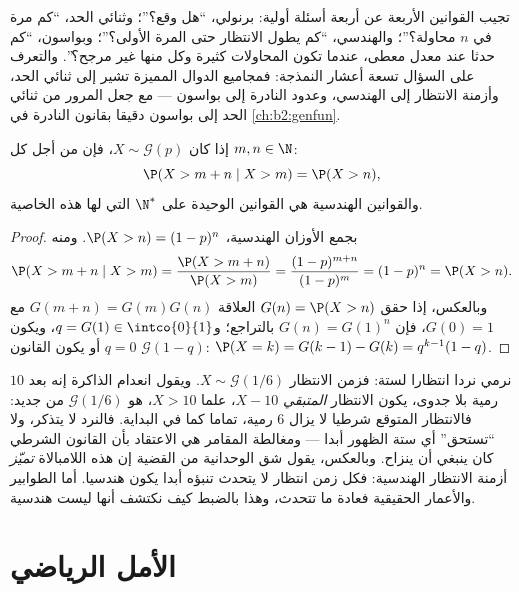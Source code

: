 \begin{remark}
تجيب القوانين الأربعة عن أربعة أسئلة أولية: برنولي، ``هل وقع؟''؛
وثنائي الحد، ``كم مرة في $n$ محاولة؟''؛ والهندسي، ``كم يطول
الانتظار حتى المرة الأولى؟''؛ وبواسون، ``كم حدثا عند معدل معطى،
عندما تكون المحاولات كثيرة وكل منها غير مرجح؟''. والتعرف على السؤال
تسعة أعشار النمذجة: فمجاميع الدوال المميزة تشير إلى ثنائي الحد،
وأزمنة الانتظار إلى الهندسي، وعدود  النادرة إلى بواسون ---
مع جعل المرور من ثنائي الحد إلى بواسون دقيقا بقانون  النادرة
في \cref{ch:b2:genfun}.
\end{remark}

\begin{proposition}\label{prop:b2:randomvar:memoryless}
إذا كان $X \sim \mathcal{G}(p)$، فإن من أجل كل $m, n \in \N$:
\[
\P(X > m + n \mid X > m) = \P(X > n) ,
\]
والقوانين الهندسية هي القوانين الوحيدة على $\N^*$ التي لها هذه
الخاصية.
\end{proposition}

\begin{proof}
بجمع الأوزان الهندسية، $\P(X > n) = (1-p)^n$. ومنه
\[
\P(X > m + n \mid X > m)
= \frac{\P(X > m + n)}{\P(X > m)}
= \frac{(1-p)^{m+n}}{(1-p)^m} = (1-p)^n = \P(X > n).
\]
وبالعكس، إذا حقق $G(n) = \P(X > n)$ العلاقة $G(m + n) =
G(m)G(n)$ مع $G(0) = 1$، فإن $G(n) = G(1)^n$ بالتراجع؛
و$q =
G(1) \in \intco{0}{1}$، ويكون $q = 0$ أو يكون القانون $\mathcal{G}(1 - q)$: $\P(X = k) = G(k-1) - G(k) =
q^{k-1}(1 - q)$.
\end{proof}

\begin{example}
نرمي نردا انتظارا لستة: فزمن الانتظار $X \sim
\mathcal G(1/6)$. ويقول انعدام الذاكرة
إنه بعد $10$ رمية بلا جدوى، يكون الانتظار \emph{المتبقي} $X - 10$،
علما  $X > 10$، هو $\mathcal G(1/6)$ من جديد: فالانتظار المتوقع شرطيا لا
يزال $6$ رمية، تماما كما في البداية. فالنرد لا يتذكر، ولا ``تستحق''
أي ستة الظهور أبدا --- ومغالطة المقامر هي الاعتقاد بأن القانون الشرطي
كان ينبغي أن ينزاح. وبالعكس، يقول شق الوحدانية من القضية إن هذه
اللامبالاة \emph{تميّز} أزمنة الانتظار الهندسية: فكل زمن انتظار لا
يتحدث تنبؤه أبدا يكون هندسيا. أما الطوابير والأعمار الحقيقية فعادة
ما تتحدث، وهذا بالضبط كيف نكتشف أنها ليست هندسية.
\end{example}

\section{الأمل الرياضي}

